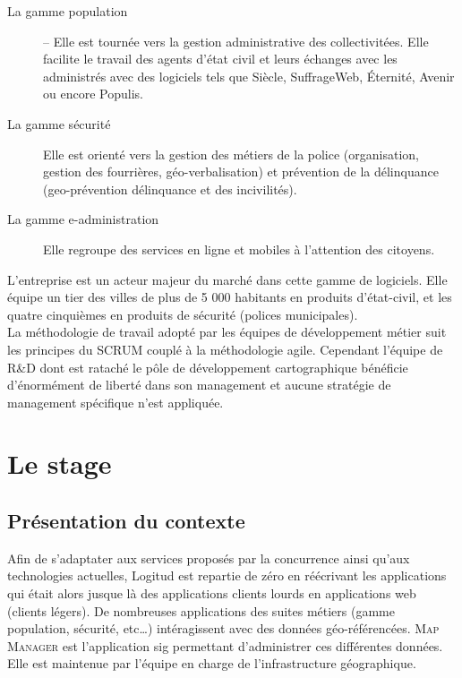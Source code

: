 \documentclass{rapportUHA40}
\begin{document}
\begin{description}
  \item[La gamme population] – Elle est tournée vers la gestion administrative des
    collectivitées. Elle facilite le travail des agents d'état civil et leurs
    échanges avec les administrés avec des logiciels tels que Siècle, SuffrageWeb,
    Éternité, Avenir ou encore Populis.
  \item[La gamme sécurité] Elle est orienté vers la gestion des métiers de la police
    (organisation, gestion des fourrières, géo-verbalisation) et prévention de la
    délinquance (geo-prévention délinquance et des incivilités).
  \item[La gamme e-administration] Elle regroupe des services en ligne et mobiles à
    l'attention des citoyens.
\end{description}

L'entreprise est un acteur majeur du marché dans cette gamme de logiciels. Elle
équipe un tier des villes de plus de 5 000 habitants en produits d’état-civil,
et les quatre cinquièmes en produits de sécurité (polices municipales).\\

La méthodologie de travail adopté par les équipes de développement métier suit
les principes du \gls{SCRUM} couplé à la méthodologie \Gls{agile}. Cependant
l'équipe de R\&D dont est rataché le pôle de développement cartographique
bénéficie d'énormément de liberté dans son management et aucune stratégie de
management spécifique n'est appliquée.

\newpage
\section{Le stage}
\subsection{Présentation du contexte}

Afin de s'adaptater aux services proposés par la concurrence ainsi qu'aux
technologies actuelles, Logitud est repartie de zéro en réécrivant les
applications qui était alors jusque là des applications clients lourds en
applications web (clients légers). De nombreuses applications des suites
métiers (gamme population, sécurité, etc\ldots) intéragissent avec des données
géo-référencées. \textsc{Map Manager} est l'application \gls{sig} permettant
d’administrer ces différentes données. Elle est maintenue par l’équipe en
charge de l’infrastructure géographique.
\end{document}
